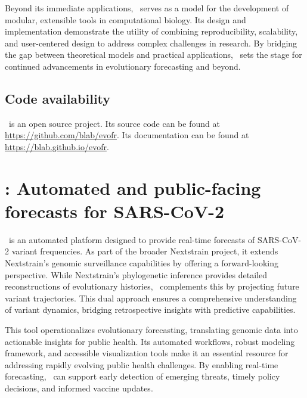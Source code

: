 Beyond its immediate applications, \evofr\ serves as a model for the development of modular, extensible tools in computational biology.
Its design and implementation demonstrate the utility of combining reproducibility, scalability, and user-centered design to address complex challenges in research. 
By bridging the gap between theoretical models and practical applications, \evofr\ sets the stage for continued advancements in evolutionary forecasting and beyond.

\subsection*{Code availability}

\evofr\ is an open source project.
Its source code can be found at \href{https://github.com/blab/evofr}{https://github.com/blab/evofr}.
Its documentation can be found at \href{https://blab.github.io/evofr}{https://blab.github.io/evofr}.

\section{\forecastsNcov: Automated and public-facing forecasts for SARS-CoV-2}


\forecastsNcov\ is an automated platform designed to provide real-time forecasts of SARS-CoV-2 variant frequencies.
As part of the broader Nextstrain project, it extends Nextstrain’s genomic surveillance capabilities by offering a forward-looking perspective. \cite{Hadfield2018}
While Nextstrain’s phylogenetic inference provides detailed reconstructions of evolutionary histories, \forecastsNcov\ complements this by projecting future variant trajectories.
This dual approach ensures a comprehensive understanding of variant dynamics, bridging retrospective insights with predictive capabilities.

This tool operationalizes evolutionary forecasting, translating genomic data into actionable insights for public health.
Its automated workflows, robust modeling framework, and accessible visualization tools make it an essential resource for addressing rapidly evolving public health challenges.
By enabling real-time forecasting, \forecastsNcov\ can support early detection of emerging threats, timely policy decisions, and informed vaccine updates.

